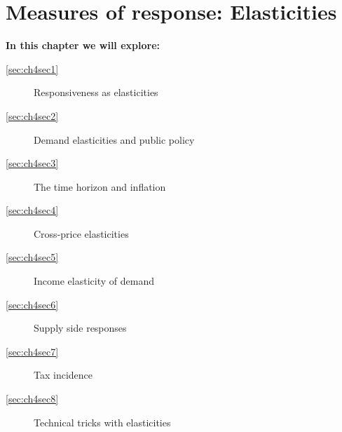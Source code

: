 \chapter{Measures of response: Elasticities}\label{chap:elasticities}

\begin{topics}
\textbf{In this chapter we will explore:}
\begin{description}
\item[\ref{sec:ch4sec1}] Responsiveness as elasticities
\item[\ref{sec:ch4sec2}] Demand elasticities and public policy
\item[\ref{sec:ch4sec3}] The time horizon and inflation
\item[\ref{sec:ch4sec4}] Cross-price elasticities
\item[\ref{sec:ch4sec5}] Income elasticity of demand
\item[\ref{sec:ch4sec6}] Supply side responses
\item[\ref{sec:ch4sec7}] Tax incidence
\item[\ref{sec:ch4sec8}] Technical tricks with elasticities
\end{description}
\end{topics}